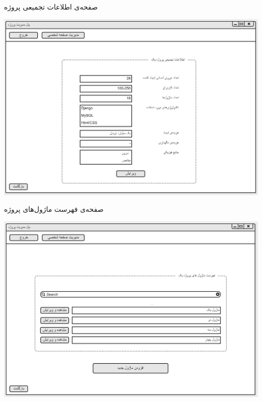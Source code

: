 \documentclass{article}
\begin{document}
\vspace{1cm}
صفحه‌ی اطلاعات تجمیعی پروژه
\begin{center}
\includegraphics[width=\textwidth]{Prototype/ProjectManager/ProjectInformation.png}
\end{center}

\newpage
\vspace{1cm}
صفحه‌ی فهرست ماژول‌های پروژه
\begin{center}
\includegraphics[width=\textwidth]{Prototype/ProjectManager/ProjectModulesList.png}
\end{center}
\end{document}

